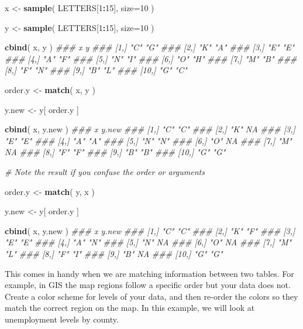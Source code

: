 \documentclass[]{book}
\newenvironment{Shaded}{\begin{snugshade}}{\end{snugshade}}
\newcommand{\CommentTok}[1]{\textcolor[rgb]{0.56,0.35,0.01}{\textit{#1}}}
\newcommand{\DataTypeTok}[1]{\textcolor[rgb]{0.13,0.29,0.53}{#1}}
\newcommand{\DecValTok}[1]{\textcolor[rgb]{0.00,0.00,0.81}{#1}}
\newcommand{\KeywordTok}[1]{\textcolor[rgb]{0.13,0.29,0.53}{\textbf{#1}}}
\newcommand{\NormalTok}[1]{#1}
\newcommand{\OperatorTok}[1]{\textcolor[rgb]{0.81,0.36,0.00}{\textbf{#1}}}
\newcommand{\StringTok}[1]{\textcolor[rgb]{0.31,0.60,0.02}{#1}}
\theoremstyle{definition}
\theoremstyle{definition}
\theoremstyle{definition}
\theoremstyle{remark}
\begin{document}
\begin{Shaded}
\begin{Highlighting}[]

\NormalTok{x <-}\StringTok{ }\KeywordTok{sample}\NormalTok{( LETTERS[}\DecValTok{1}\OperatorTok{:}\DecValTok{15}\NormalTok{], }\DataTypeTok{size=}\DecValTok{10}\NormalTok{ )}

\NormalTok{y <-}\StringTok{ }\KeywordTok{sample}\NormalTok{( LETTERS[}\DecValTok{1}\OperatorTok{:}\DecValTok{15}\NormalTok{], }\DataTypeTok{size=}\DecValTok{10}\NormalTok{ )}

\KeywordTok{cbind}\NormalTok{( x, y )}
\CommentTok{###       x   y  }
\CommentTok{###  [1,] "C" "G"}
\CommentTok{###  [2,] "K" "A"}
\CommentTok{###  [3,] "E" "E"}
\CommentTok{###  [4,] "A" "F"}
\CommentTok{###  [5,] "N" "I"}
\CommentTok{###  [6,] "O" "H"}
\CommentTok{###  [7,] "M" "B"}
\CommentTok{###  [8,] "F" "N"}
\CommentTok{###  [9,] "B" "L"}
\CommentTok{### [10,] "G" "C"}

\NormalTok{order.y <-}\StringTok{ }\KeywordTok{match}\NormalTok{( x, y )}

\NormalTok{y.new <-}\StringTok{ }\NormalTok{y[ order.y ]}

\KeywordTok{cbind}\NormalTok{( x, y.new )}
\CommentTok{###       x   y.new}
\CommentTok{###  [1,] "C" "C"  }
\CommentTok{###  [2,] "K" NA   }
\CommentTok{###  [3,] "E" "E"  }
\CommentTok{###  [4,] "A" "A"  }
\CommentTok{###  [5,] "N" "N"  }
\CommentTok{###  [6,] "O" NA   }
\CommentTok{###  [7,] "M" NA   }
\CommentTok{###  [8,] "F" "F"  }
\CommentTok{###  [9,] "B" "B"  }
\CommentTok{### [10,] "G" "G"}


\CommentTok{# Note the result if you confuse the order or arguments}

\NormalTok{order.y <-}\StringTok{ }\KeywordTok{match}\NormalTok{( y, x )}

\NormalTok{y.new <-}\StringTok{ }\NormalTok{y[ order.y ]}

\KeywordTok{cbind}\NormalTok{( x, y.new )}
\CommentTok{###       x   y.new}
\CommentTok{###  [1,] "C" "C"  }
\CommentTok{###  [2,] "K" "F"  }
\CommentTok{###  [3,] "E" "E"  }
\CommentTok{###  [4,] "A" "N"  }
\CommentTok{###  [5,] "N" NA   }
\CommentTok{###  [6,] "O" NA   }
\CommentTok{###  [7,] "M" "L"  }
\CommentTok{###  [8,] "F" "I"  }
\CommentTok{###  [9,] "B" NA   }
\CommentTok{### [10,] "G" "G"}
\end{Highlighting}
\end{Shaded}

This comes in handy when we are matching information between two tables.
For example, in GIS the map regions follow a specific order but your
data does not. Create a color scheme for levels of your data, and then
re-order the colors so they match the correct region on the map. In this
example, we will look at unemployment levels by county.
\end{document}
